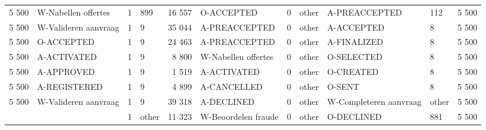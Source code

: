 \begin{tabular}{llllrlllllr}
5 500 & W-Nabellen offertes & 1 & 899 & 16 557 & O-ACCEPTED & 0 & other & A-PREACCEPTED & 112 & 5 500 \\
5 500 & W-Valideren aanvraag & 1 & 9 & 35 044 & A-PREACCEPTED & 0 & other & A-ACCEPTED & 8 & 5 500 \\
5 500 & O-ACCEPTED & 1 & 9 & 24 463 & A-PREACCEPTED & 0 & other & A-FINALIZED & 8 & 5 500 \\
5 500 & A-ACTIVATED & 1 & 9 & 8 800 & W-Nabellen offertes & 0 & other & O-SELECTED & 8 & 5 500 \\
5 500 & A-APPROVED & 1 & 9 & 1 519 & A-ACTIVATED & 0 & other & O-CREATED & 8 & 5 500 \\
5 500 & A-REGISTERED & 1 & 9 & 4 899 & A-CANCELLED & 0 & other & O-SENT & 8 & 5 500 \\
5 500 & W-Valideren aanvraag & 1 & 9 & 39 318 & A-DECLINED & 0 & other & W-Completeren aanvraag & other & 5 500 \\
 &  & 1 & other & 11 323 & W-Beoordelen fraude & 0 & other & O-DECLINED & 881 & 5 500 \\
\bottomrule
\end{tabular}
